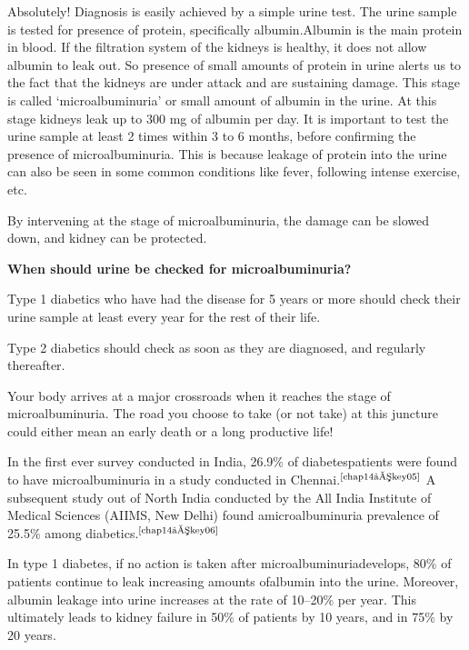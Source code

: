 Absolutely! Diagnosis is easily achieved by a simple urine test. The urine sample is tested for presence of protein, specifically albumin.\break Albumin is the main protein in blood. If the filtration system of the kidneys is healthy, it does not allow albumin to leak out. So presence of small amounts of protein in urine alerts us to the fact that the kidneys are under attack and are sustaining damage. This stage is called ‘microalbuminuria’ or small amount of albumin in the urine. At this stage kidneys leak up to 300 mg of albumin per day. It is important to test the urine sample at least 2 times within 3 to 6 months, before confirming the presence of microalbuminuria. This is because leakage of protein into the urine can also be seen in some common conditions like fever, following intense exercise, etc.

By intervening at the stage of microalbuminuria, the damage can be slowed down, and kidney can be protected.

\vskip 8pt
\noindent\textbf{When should urine be checked for microalbuminuria?}

Type 1 diabetics who have had the disease for 5 years or more should check their urine sample at least every year for the rest of their life.

Type 2 diabetics should check as soon as they are diagnosed, and regularly thereafter.

\vskip 8pt

Your body arrives at a major crossroads when it reaches the stage of microalbuminuria. The road you choose to take (or not take) at this juncture could either mean an early death or a long productive life!

In the first ever survey conducted in India, 26.9\% of diabetes\break patients were found to have microalbuminuria in a study conducted in Chennai.$^{\text{\cite{chap14–key05}}}$ A subsequent study out of North India conducted by the All India Institute of Medical Sciences (AIIMS, New Delhi) found a\break microalbuminuria prevalence of 25.5\% among diabetics.$^{\text{\cite{chap14–key06}}}$

In type 1 diabetes, if no action is taken after microalbuminuria\break develops, 80\% of patients continue to leak increasing amounts of\break albumin into the urine. Moreover, albumin leakage into urine increases at the rate of 10–20\% per year. This ultimately leads to kidney failure in 50\% of patients by 10 years, and in 75\% by 20 years.

